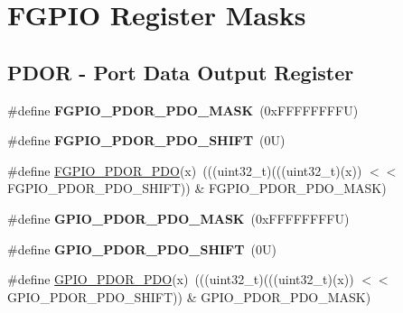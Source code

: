 \hypertarget{group___f_g_p_i_o___register___masks}{}\section{F\+G\+P\+IO Register Masks}
\label{group___f_g_p_i_o___register___masks}
\subsection*{P\+D\+OR -\/ Port Data Output Register}
\begin{DoxyCompactItemize}
\item 
\mbox{\label{group___f_g_p_i_o___register___masks_ga36d3575737128f82053b0b713c2ba12c}} 
\#define {\bfseries F\+G\+P\+I\+O\+\_\+\+P\+D\+O\+R\+\_\+\+P\+D\+O\+\_\+\+M\+A\+SK}~(0x\+F\+F\+F\+F\+F\+F\+F\+F\+U)
\item 
\mbox{\label{group___f_g_p_i_o___register___masks_gac47066e363d078fd698fccc3e2717b7e}} 
\#define {\bfseries F\+G\+P\+I\+O\+\_\+\+P\+D\+O\+R\+\_\+\+P\+D\+O\+\_\+\+S\+H\+I\+FT}~(0\+U)
\item 
\#define \mbox{\hyperlink{group___f_g_p_i_o___register___masks_gafab743986cbbf8fdbf9ed322104e413d}{F\+G\+P\+I\+O\+\_\+\+P\+D\+O\+R\+\_\+\+P\+DO}}(x)~(((uint32\+\_\+t)(((uint32\+\_\+t)(x)) $<$$<$ F\+G\+P\+I\+O\+\_\+\+P\+D\+O\+R\+\_\+\+P\+D\+O\+\_\+\+S\+H\+I\+FT)) \& F\+G\+P\+I\+O\+\_\+\+P\+D\+O\+R\+\_\+\+P\+D\+O\+\_\+\+M\+A\+SK)
\item 
\mbox{\label{group___f_g_p_i_o___register___masks_gafd2a8274691295293b3cabfe86089801}} 
\#define {\bfseries G\+P\+I\+O\+\_\+\+P\+D\+O\+R\+\_\+\+P\+D\+O\+\_\+\+M\+A\+SK}~(0x\+F\+F\+F\+F\+F\+F\+F\+F\+U)
\item 
\mbox{\label{group___f_g_p_i_o___register___masks_ga495b5f1e63de863534ce0c5f25f137ab}} 
\#define {\bfseries G\+P\+I\+O\+\_\+\+P\+D\+O\+R\+\_\+\+P\+D\+O\+\_\+\+S\+H\+I\+FT}~(0\+U)
\item 
\#define \mbox{\hyperlink{group___f_g_p_i_o___register___masks_ga4071beeff4d9b5c200686972dd52d855}{G\+P\+I\+O\+\_\+\+P\+D\+O\+R\+\_\+\+P\+DO}}(x)~(((uint32\+\_\+t)(((uint32\+\_\+t)(x)) $<$$<$ G\+P\+I\+O\+\_\+\+P\+D\+O\+R\+\_\+\+P\+D\+O\+\_\+\+S\+H\+I\+FT)) \& G\+P\+I\+O\+\_\+\+P\+D\+O\+R\+\_\+\+P\+D\+O\+\_\+\+M\+A\+SK)
\end{DoxyCompactItemize}
